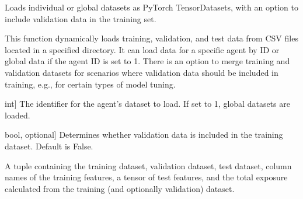 \documentclass[letterpaper,10pt,english]{sphinxmanual}
\begin{document}
\begin{fulllineitems}
\label{\detokenize{utils:utils.load_individual_data}}
\pysigstartsignatures
{}
\pysigstopsignatures
\sphinxAtStartPar
Loads individual or global datasets as PyTorch TensorDatasets, with an option to include validation data in the training set.

\sphinxAtStartPar
This function dynamically loads training, validation, and test data from CSV files located in a specified directory.
It can load data for a specific agent by ID or global data if the agent ID is set to \sphinxhyphen{}1. There is an option to merge
training and validation datasets for scenarios where validation data should be included in training, e.g., for certain
types of model tuning.
\begin{description}
\begin{description}
\sphinxlineitem{agent\_id}{[}int{]}
\sphinxAtStartPar
The identifier for the agent’s dataset to load. If set to \sphinxhyphen{}1, global datasets are loaded.

\sphinxlineitem{include\_val\_in\_train}{[}bool, optional{]}
\sphinxAtStartPar
Determines whether validation data is included in the training dataset. Default is False.

\end{description}

\begin{description}
\sphinxAtStartPar
A tuple containing the training dataset, validation dataset, test dataset, column names of the training features,
a tensor of test features, and the total exposure calculated from the training (and optionally validation) dataset.

\end{description}

\begin{sphinxVerbatim}[commandchars=\\\{\}]
        
\end{sphinxVerbatim}

\end{description}

\end{fulllineitems}
\end{document}
